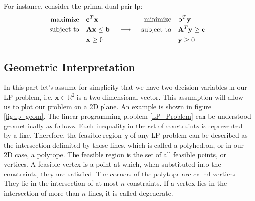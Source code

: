 For instance, consider the primal-dual pair \gls{lp}:
\[
    \begin{array}{c@{\quad}c@{\quad}c}
        \begin{aligned}
            \text{maximize} \quad   & \mathbf{c}^T \mathbf{x}               \\
            \text{subject to} \quad & \mathbf{A} \mathbf{x} \leq \mathbf{b} \\
                                    & \mathbf{x} \geq 0                     \\
        \end{aligned}
         &
        \begin{array}{c}
            \longrightarrow
        \end{array}
         &
        \begin{aligned}
            \text{minimize} \quad   & \mathbf{b}^T \mathbf{y}                 \\
            \text{subject to} \quad & \mathbf{A}^T \mathbf{y} \geq \mathbf{c} \\
                                    & \mathbf{y} \geq 0                       \\
        \end{aligned}
    \end{array}
\]

\subsection{Geometric Interpretation}
In this part let's assume for simplicity that we have two decision variables
in our LP problem, i.e. $\mathbf{x} \in \mathbb{R}^2 $
is a two dimensional vector. This assumption will allow us to plot our problem on
a 2D plane. An example is shown in figure \ref{fig:lp_geom}.
The linear programming problem \ref{LP_Problem} can be understood geometrically as follows:
Each inequality in the set of constraints is represented by a line.
Therefore, the feasible region $\chi$ of any LP problem can be described as the intersection delimited
by those lines, which is called a polyhedron, or in our 2D case, a polytope.
The feasible region is the set of all feasible points, or vertices.
A feasible vertex is a point at which, when substituted into the constraints, they are satisfied.
The corners of the polytope are called vertices.
They lie in the intersection of at most $n$ constraints. If a vertex lies in the
intersection of more than $n$ lines, it is called degenerate.

